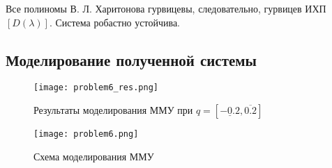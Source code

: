 Все полиномы В. Л. Харитонова гурвицевы, следовательно, гурвицев ИХП $[D(\lambda)]$. Система робастно устойчива.

\subsection{Моделирование полученной системы}

\begin{figure}[h!]
	\centering
	\texttt{[image: problem6\_res.png]}
	\caption{Результаты моделирования ММУ при $q = [\underline{-0.2}, \overline{0.2}]$}
	\label{}
\end{figure}
\newpage



\begin{figure}[h!]
	\centering
	\texttt{[image: problem6.png]}
	\caption{Схема моделирования ММУ}
	\label{}
\end{figure}


\newpage